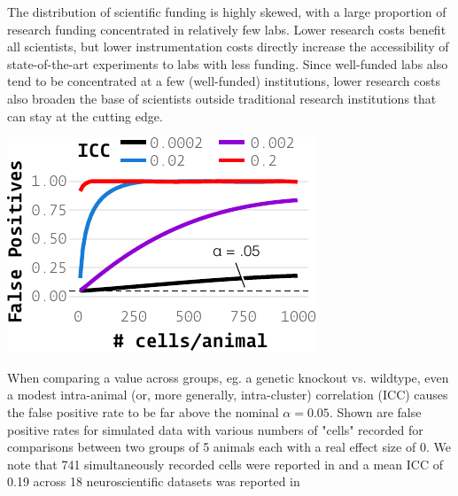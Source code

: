 The distribution of scientific funding is highly skewed, with a large proportion of research funding concentrated in relatively few labs\citep{katzBiomedicalEliteInequality2017}. Lower research costs benefit all scientists, but lower instrumentation costs directly increase the accessibility of state-of-the-art experiments to labs with less funding. Since well-funded labs also tend to be concentrated at a few (well-funded) institutions, lower research costs also broaden the base of scientists outside traditional research institutions that can stay at the cutting edge\citep{ashkenasEvenAffirmativeAction2017,clausetSystematicInequalityHierarchy2015,pearceExpandingEquitableAccess2019}.
\clearpage%
%
\begin{marginfigure}[0.5cm]
\includegraphics[]{figures/fpr.pdf}
\caption{When comparing a value across groups, eg. a genetic knockout vs. wildtype, even a modest intra-animal (or, more generally, intra-cluster) correlation (ICC) causes the false positive rate to be far above the nominal $\alpha = 0.05$. Shown are false positive rates for simulated data with various numbers of "cells" recorded for comparisons between two groups of 5 animals each with a real effect size of 0. We note that 741 simultaneously recorded cells were reported in \citep{junFullyIntegratedSilicon2017} and a mean ICC of 0.19 across 18 neuroscientific datasets was reported in \citep{aartsSolutionDependencyUsing2014}}
\label{fig:icc}
\end{marginfigure}%
%

